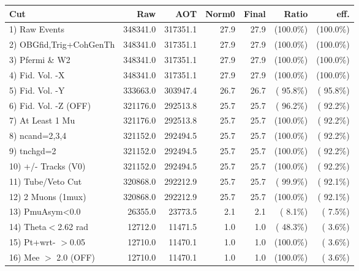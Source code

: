  \begin{table}[h!]\centering
 \begin{tabular}{||l||r|r|r|r|r|r||}
 \hline
 \hline
 Cut & Raw & AOT & Norm0 & Final & Ratio & eff.       \\
 \hline
  1) Raw Events           &     348341.0 &     317351.1 &         27.9 &         27.9 & (100.0\%) & (100.0\%) \\
  2) OBGfid,Trig+CohGenTh &     348341.0 &     317351.1 &         27.9 &         27.9 & (100.0\%) & (100.0\%) \\
  3) Pfermi \& W2         &     348341.0 &     317351.1 &         27.9 &         27.9 & (100.0\%) & (100.0\%) \\
  4) Fid. Vol. -X         &     348341.0 &     317351.1 &         27.9 &         27.9 & (100.0\%) & (100.0\%) \\
  5) Fid. Vol. -Y         &     333663.0 &     303947.4 &         26.7 &         26.7 & ( 95.8\%) & ( 95.8\%) \\
  6) Fid. Vol. -Z (OFF)   &     321176.0 &     292513.8 &         25.7 &         25.7 & ( 96.2\%) & ( 92.2\%) \\
  7) At Least 1 Mu        &     321176.0 &     292513.8 &         25.7 &         25.7 & (100.0\%) & ( 92.2\%) \\
  8) ncand=2,3,4          &     321152.0 &     292494.5 &         25.7 &         25.7 & (100.0\%) & ( 92.2\%) \\
  9) tnchgd=2             &     321152.0 &     292494.5 &         25.7 &         25.7 & (100.0\%) & ( 92.2\%) \\
 10) +/- Tracks (V0)      &     321152.0 &     292494.5 &         25.7 &         25.7 & (100.0\%) & ( 92.2\%) \\
 11) Tube/Veto Cut        &     320868.0 &     292212.9 &         25.7 &         25.7 & ( 99.9\%) & ( 92.1\%) \\
 12) 2 Muons (1mux)       &     320868.0 &     292212.9 &         25.7 &         25.7 & (100.0\%) & ( 92.1\%) \\
 13) PmuAsym<0.0          &      26355.0 &      23773.5 &          2.1 &          2.1 & (  8.1\%) & (  7.5\%) \\
 14) Theta$<$2.62 rad     &      12712.0 &      11471.5 &          1.0 &          1.0 & ( 48.3\%) & (  3.6\%) \\
 15) Pt+wrt- $>$0.05      &      12710.0 &      11470.1 &          1.0 &          1.0 & (100.0\%) & (  3.6\%) \\
 16) Mee $>$ 2.0  (OFF)   &      12710.0 &      11470.1 &          1.0 &          1.0 & (100.0\%) & (  3.6\%) \\

\end{tabular}
\end{table}
